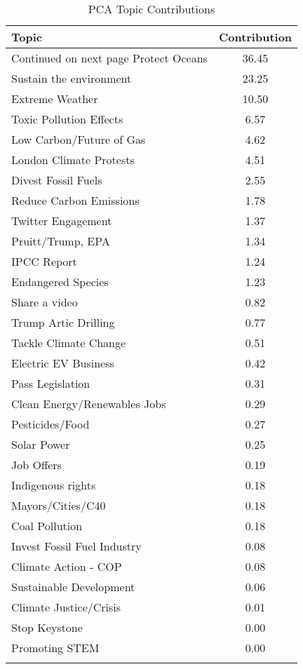 \begin{longtable}{Lc}
\caption{PCA Topic Contributions} \\ 
  \hline
Topic & Contribution \\ 
  \hline 
\endhead 
\hline 
{\footnotesize Continued on next page} 
\endfoot 
\endlastfoot 
Protect Oceans & 36.45 \\ 
  Sustain the environment & 23.25 \\ 
  Extreme Weather & 10.50 \\ 
  Toxic Pollution Effects & 6.57 \\ 
  Low Carbon/Future of Gas & 4.62 \\ 
  London Climate Protests & 4.51 \\ 
  Divest Fossil Fuels & 2.55 \\ 
  Reduce Carbon Emissions & 1.78 \\ 
  Twitter Engagement & 1.37 \\ 
  Pruitt/Trump, EPA & 1.34 \\ 
  IPCC Report & 1.24 \\ 
  Endangered Species & 1.23 \\ 
  Share a video & 0.82 \\ 
  Trump Artic Drilling & 0.77 \\ 
  Tackle Climate Change & 0.51 \\ 
  Electric EV Business & 0.42 \\ 
  Pass Legislation & 0.31 \\ 
  Clean Energy/Renewables Jobs & 0.29 \\ 
  Pesticides/Food & 0.27 \\ 
  Solar Power & 0.25 \\ 
  Job Offers & 0.19 \\ 
  Indigenous rights & 0.18 \\ 
  Mayors/Cities/C40 & 0.18 \\ 
  Coal Pollution & 0.18 \\ 
  Invest Fossil Fuel Industry & 0.08 \\ 
  Climate Action - COP & 0.08 \\ 
  Sustainable Development & 0.06 \\ 
  Climate Justice/Crisis & 0.01 \\ 
  Stop Keystone & 0.00 \\ 
  Promoting STEM & 0.00 \\ 
  \hline
\label{tab:TopicContribs_all}
\end{longtable}
